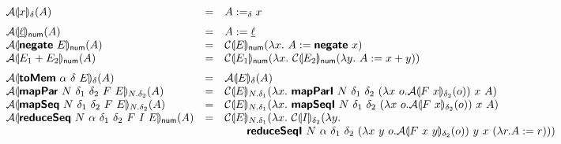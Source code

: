 \begin{figure}[H]
  \begin{displaymath}
    \begin{array}{lcl}
      \semA{x}_\delta(A)
      &=& A :=_\delta x
      \medskip\\

      \semA{\underline{\ell}}_{\num}(A)
      &=& A := \underline{\ell}
      \\
      \semA{\prim{negate}~E}_{\num}(A)
      &=& \semE{E}_{\num}(\lambda x.~A := \prim{negate}~x)
      \\
      \semA{E_1 + E_2}_{\num}(A)
      &=& \semE{E_1}_{\num}(\lambda x.~\semE{E_2}_{\num}(\lambda y.~A := x + y))
      \medskip\\

      \semA{\prim{toMem}~\alpha~\delta~E}_{\delta}(A)
      &=& \semA{E}_\delta(A)
      \\
      \semA{\prim{mapPar}~N~\delta_1~\delta_2~F~E}_{N.\delta_2}(A)
      &=& \semE{E}_{N.\delta_1}(\lambda x.~\prim{mapParI}~N~\delta_1~\delta_2~(\lambda x~o. \semA{F~x}_{\delta_2}(o))~x~A)
      \\
      \semA{\prim{mapSeq}~N~\delta_1~\delta_2~F~E}_{N.\delta_2}(A)
      &=& \semE{E}_{N.\delta_1}(\lambda x.~\prim{mapSeqI}~N~\delta_1~\delta_2~(\lambda x~o. \semA{F~x}_{\delta_2}(o))~x~A)
      \\
      \semA{\prim{reduceSeq}~N~\alpha~\delta_1~\delta_2~F~I~E}_{\mathsf{num}}(A)
      &=& \begin{array}[t]{@{}l}
            \semE{E}_{N.\delta_1}(\lambda x.~\semE{I}_{\delta_2}(\lambda y.\\
            \quad\quad \prim{reduceSeqI}~N~\alpha~\delta_1~\delta_2~(\lambda x~y~o. \semA{F~x~y}_{\delta_2}(o))~y~x~(\lambda r.A := r)))
          \end{array}
      \medskip\\


\end{array}
\end{displaymath}
\end{figure}
